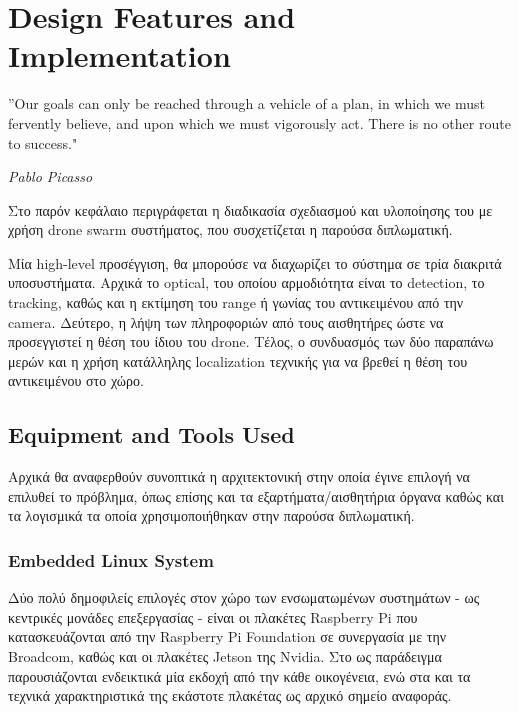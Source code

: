 \chapter{Design Features and Implementation} %
\label{chap:Chapter4}  %

\epigraph{”Our goals can only be reached through a vehicle of a plan, in which we must fervently believe, and upon which we must vigorously act. There is no other route to success." }{\textit{Pablo Picasso}}

Στο παρόν κεφάλαιο περιγράφεται η διαδικασία σχεδιασμού και υλοποίησης του  με χρήση drone swarm συστήματος, που συσχετίζεται η παρούσα διπλωματική. 

Μία high-level προσέγγιση, θα μπορούσε να διαχωρίζει το σύστημα σε τρία διακριτά
υποσυστήματα. Αρχικά το optical, του οποίου αρμοδιότητα είναι το detection, το tra\-cking, καθώς και η εκτίμηση
του range ή γωνίας του αντικειμένου από την camera. Δεύτερο, η λήψη των πληροφοριών από τους αισθητήρες ώστε να προσεγγιστεί η θέση του ίδιου
του drone. Τέλος, ο συνδυασμός των δύο παραπάνω μερών και η χρήση κατάλληλης localization τεχνικής για να βρεθεί η θέση του αντικειμένου
στο  χώρο.


\section{Equipment and Tools Used} \label{sec:design-tools}
Αρχικά θα αναφερθούν συνοπτικά η αρχιτεκτονική στην οποία έγινε επιλογή να επιλυθεί το πρόβλημα,
όπως επίσης και τα εξαρτήματα/αισθητήρια όργανα καθώς και τα λογισμικά τα οποία χρησιμοποιήθηκαν στην παρούσα διπλωματική. 

\subsection{Embedded Linux System}
Δύο πολύ δημοφιλείς επιλογές στον χώρο των ενσωματωμένων συστημάτων - ως κεντρικές μονάδες επεξεργασίας - είναι οι πλακέτες Raspberry Pi που κατασκευάζονται από την Raspberry Pi Foundation σε συνεργασία με την Broadcom, καθώς και οι πλακέτες Jetson της Nvidia. Στο  ως παράδειγμα παρουσιάζονται ενδεικτικά μία εκδοχή από την κάθε οικογένεια, ενώ στα  και  τα τεχνικά χαρακτηριστικά της εκάστοτε πλακέτας ως αρχικό σημείο αναφοράς. 


